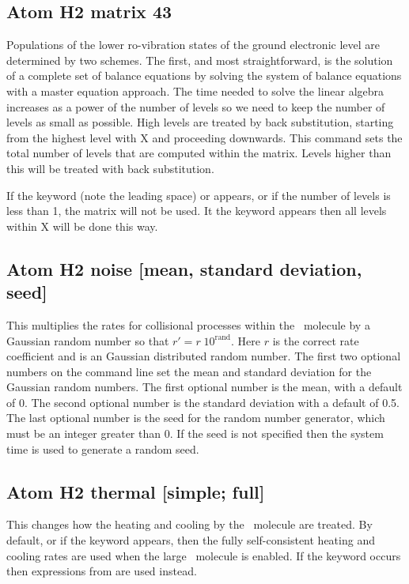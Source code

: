 \subsection{Atom H2 matrix 43}

Populations of the lower ro-vibration states of the ground electronic
level are determined by two schemes.
The first, and most straightforward,
is the solution of a complete set of balance equations by solving
the system
of balance equations with a master equation approach.
The time needed to solve the linear
algebra increases as a power of the number of levels
so we need to keep
the number of levels as small as possible.
High levels are treated by back
substitution, starting from the highest level with X and proceeding
downwards.
This command sets the total number of levels that are computed
within the matrix.
Levels higher than this will be treated with back
substitution.

If the keyword  (note the leading space) or
 appears, or if the
number of levels is less than 1, the matrix will not be used.
It the keyword
 appears then all levels within X will be done this way.

\subsection{Atom H2 noise [mean, standard deviation, seed]}

This multiplies the rates for collisional processes within the \htwo\ molecule
by a Gaussian random number so that $r' = r\;10^{{\mathrm{rand}}} $.
Here $r$
is the correct rate coefficient and  is an Gaussian
distributed random number.  The first two optional numbers on the command
line set the mean and standard deviation for the Gaussian random numbers.
The first optional number is the mean, with a default of 0.  The second
optional number is the standard deviation with a default of 0.5.  The last
optional number is the seed for the random number generator, which must
be an integer greater than 0.
If the seed is not specified then the system
time is used to generate a random seed.

\subsection{Atom H2 thermal [simple; full]}

This changes how the heating and cooling by the \htwo\ molecule
are treated.
By default, or if the keyword  appears,
then the fully self-consistent
heating and cooling rates are used when the large \htwo\ molecule
is enabled.
If the keyword  occurs then expressions
from \citet{Tielens1985a} are used instead.

